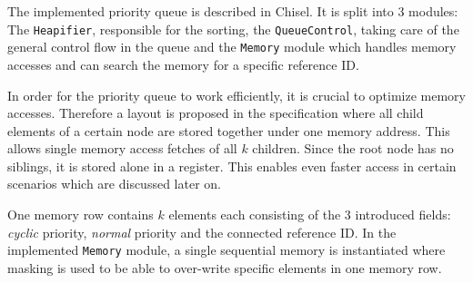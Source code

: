 \documentclass[conference]{IEEEtran}
\begin{document}
The implemented priority queue is described in Chisel.
It is split into 3 modules: The \texttt{Heapifier}, responsible for the sorting, the \texttt{QueueControl}, taking care
of the general control flow in the queue and the \texttt{Memory} module which handles memory accesses and can search the memory for a specific reference 
ID.

In order for the priority queue to work efficiently, it is crucial to optimize memory accesses. Therefore a layout is proposed in the specification where all 
child elements of a certain node are stored together under one memory address. This allows single memory access fetches of all $k$ children. Since 
the root node has no siblings, it is stored alone in a register. This enables even faster access in certain scenarios which are discussed later on.

One memory row contains $k$ elements each consisting of the 3 introduced fields: \textit{cyclic} priority, \textit{normal} priority and the connected
reference ID. In the implemented \texttt{Memory} module, a single sequential memory is instantiated where masking is used to be able to over-write specific elements in one memory row.
\end{document}
